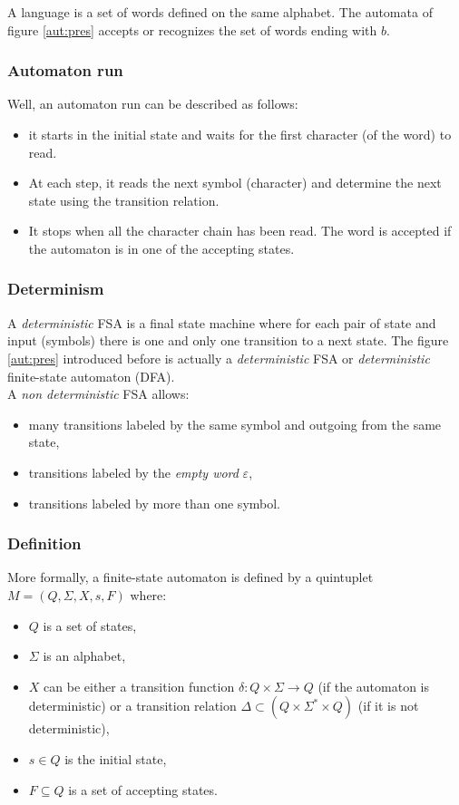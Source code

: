 \noindent A language is a set of words defined on the same alphabet. The automata of figure \ref{aut:pres}
accepts or recognizes the set of words ending with $b$.

\subsubsection{Automaton run}
Well, an automaton run can be described as follows:
\begin{itemize}
 \item it starts in the initial state and waits for the first character (of the word) to read.
 \item At each step, it reads the next symbol (character) and determine the next state using the
       transition relation.
 \item It stops when all the character chain has been read. The word is accepted if the automaton is
       in one of the accepting states.
\end{itemize}

\subsubsection{Determinism}
A \textit{deterministic} FSA is a final state machine where for each pair of state and input (symbols)
there is one and only one transition to a next state. The figure \ref{aut:pres} introduced before is
actually a \textit{deterministic} FSA or \textit{deterministic} finite-state automaton (DFA).\\

\noindent A \textit{non deterministic} FSA allows:
\begin{itemize}
 \item many transitions labeled by the same symbol and outgoing from the same state,
 \item transitions labeled by the \textit{empty word} $\varepsilon$,
 \item transitions labeled by more than one symbol.
\end{itemize}


\subsubsection{Definition}
More formally, a finite-state automaton is defined by a quintuplet $M=(Q, \Sigma, X, s, F)$ where:
\begin{itemize}
 \item $Q$ is a set of states,
 \item $\Sigma$ is an alphabet,
 \item $X$ can be either a transition function $\delta : Q \times \Sigma \rightarrow Q$ (if the automaton is
       deterministic) or a transition relation $\Delta \subset (Q \times \Sigma^* \times Q)$ (if it is not
       deterministic),
 \item $s \in Q$ is the initial state,
 \item $F \subseteq Q$ is a set of accepting states.
\end{itemize}



